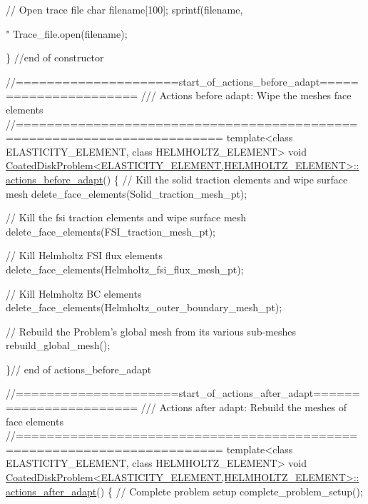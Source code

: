 \begin{DoxyCodeInclude}
 \textcolor{comment}{// Open trace file}
 \textcolor{keywordtype}{char} filename[100];
 sprintf(filename,\textcolor{stringliteral}{"%
 Trace\_file.open(filename);
  

\} \textcolor{comment}{//end of constructor}


\textcolor{comment}{//=====================start\_of\_actions\_before\_adapt======================}\textcolor{comment}{}
\textcolor{comment}{/// Actions before adapt: Wipe the meshes face elements}
\textcolor{comment}{}\textcolor{comment}{//========================================================================}
\textcolor{keyword}{template}<\textcolor{keyword}{class} ELASTICITY\_ELEMENT, \textcolor{keyword}{class} HELMHOLTZ\_ELEMENT>
\textcolor{keywordtype}{void} \hyperlink{classCoatedDiskProblem_a89e972df172b024b1358f0fac7646d6d}{CoatedDiskProblem<ELASTICITY\_ELEMENT,HELMHOLTZ\_ELEMENT>::}
\hyperlink{classCoatedDiskProblem_a89e972df172b024b1358f0fac7646d6d}{actions\_before\_adapt}()
\{
 \textcolor{comment}{// Kill the solid traction elements and wipe surface mesh}
 delete\_face\_elements(Solid\_traction\_mesh\_pt);

 \textcolor{comment}{// Kill the fsi traction elements and wipe surface mesh}
 delete\_face\_elements(FSI\_traction\_mesh\_pt);
 
 \textcolor{comment}{// Kill Helmholtz FSI flux elements}
 delete\_face\_elements(Helmholtz\_fsi\_flux\_mesh\_pt);
 
 \textcolor{comment}{// Kill Helmholtz BC elements }
 delete\_face\_elements(Helmholtz\_outer\_boundary\_mesh\_pt);
 
 \textcolor{comment}{// Rebuild the Problem's global mesh from its various sub-meshes}
 rebuild\_global\_mesh();

\}\textcolor{comment}{// end of actions\_before\_adapt}



\textcolor{comment}{//=====================start\_of\_actions\_after\_adapt=======================}\textcolor{comment}{}
\textcolor{comment}{///  Actions after adapt: Rebuild the meshes of face elements}
\textcolor{comment}{}\textcolor{comment}{//========================================================================}
\textcolor{keyword}{template}<\textcolor{keyword}{class} ELASTICITY\_ELEMENT, \textcolor{keyword}{class} HELMHOLTZ\_ELEMENT>
\textcolor{keywordtype}{void} \hyperlink{classCoatedDiskProblem_a93f9d34cd24f08ca1ec726ae0057b939}{CoatedDiskProblem<ELASTICITY\_ELEMENT,HELMHOLTZ\_ELEMENT>::}
\hyperlink{classCoatedDiskProblem_a93f9d34cd24f08ca1ec726ae0057b939}{actions\_after\_adapt}()
\{
 \textcolor{comment}{// Complete problem setup}
 complete\_problem\_setup(); 

}
\end{DoxyCodeInclude}
